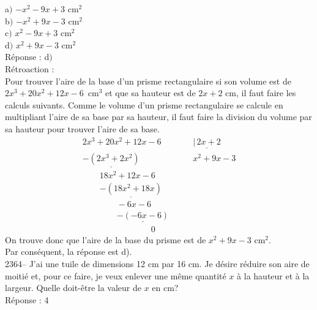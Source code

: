 \documentclass[letterpaper, 12pt]{article}
\begin{document}
a$)$ $-x^{2}-9x+3$ cm$^{2}$\\
b$)$ $-x^{2}+9x-3$ cm$^{2}$\\
c$)$ $x^{2}-9x+3$ cm$^{2}$\\
d$)$ $x^{2}+9x-3$ cm$^{2}$\\

R\'eponse : d$)$\\

R\'etroaction :\\
Pour trouver l'aire de la base d'un prisme rectangulaire si son volume est de \mbox{$2x^{3}+20x^{2}+12x-6$ cm$^{3}$} et que sa hauteur est de $2x+2$ cm, il faut faire les calculs suivants. Comme le volume d'un prisme rectangulaire se calcule en multipliant l'aire de sa base par sa hauteur, il faut faire la division du volume par sa hauteur pour trouver l'aire de sa base.
\begin{eqnarray*}
2x^{3}+20x^{2}+12x-6  & &\underline{|\, 2x+2}\\
\underline{-(2x^{3}+ 2x^{2})} \qquad \qquad & & x^{2}+9x-3\\
\qquad 18x^{2}+12x-6 \,\,\, & &\\
\qquad \underline{-(18x^{2}+18x)}\qquad & &\\
\qquad \qquad -6x-6 \, & &\\
\qquad \qquad \underline{-(-6x-6)} \, & &\\
\qquad \qquad \qquad \qquad 0 \, & &
\end{eqnarray*}
On trouve donc que l'aire de la base du prisme est de $x^{2}+9x-3$ cm$^{2}$.\\
Par cons\'equent, la r\'eponse est d).\\

2364-- J'ai une tuile de dimensions 12 cm par 16 cm. Je d\'esire r\'eduire son aire de moiti\'e et, pour ce faire, je veux enlever une m\^eme quantit\'e $x$ \`a la hauteur et \`a la largeur. Quelle doit-\^etre la valeur de $x$ en cm?\\

R\'eponse : 4\\
\end{document}
